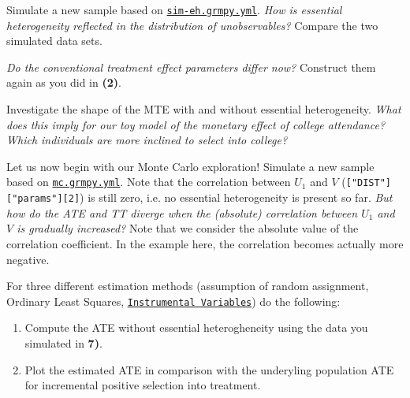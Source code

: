 \begin{boenumerate}\setcounter{enumi}{3}
  
  \item Simulate a new sample based on \href{https://github.com/HumanCapitalAnalysis/microeconometrics/blob/prset_grmpy/problem-sets/04-generalized-roy-model/sources/sim-eh.grmpy.yml}{\texttt{sim-eh.grmpy.yml}}. \emph{How is essential heterogeneity reflected in the distribution of unobservables?} Compare the two simulated data sets.
  
  \item \emph{Do the conventional treatment effect parameters differ now?} Construct them again as you did in \textbf{(2)}.
  
  \item Investigate the shape of the MTE with and without essential heterogeneity. \emph{What does this imply for our toy model of the monetary effect of college attendance? Which individuals are more inclined to select into college?}
  
  \item Let us now begin with our Monte Carlo exploration! Simulate a new sample based on \href{https://github.com/HumanCapitalAnalysis/microeconometrics/blob/prset_grmpy/problem-sets/04-generalized-roy-model/sources/mc.grmpy.yml}{\texttt{mc.grmpy.yml}}. Note that the correlation between $U_1$ and $V$ (\texttt{["DIST"]["params"][2]}) is still zero, i.e. no essential heterogeneity is present so far. \emph{But how do the ATE and TT diverge when the (absolute) correlation between $U_1$ and $V$ is gradually increased?} Note that we consider the absolute value of the correlation coefficient. In the example here, the correlation becomes actually more negative.
  
  \item For three different estimation methods (assumption of random assignment, Ordinary Least Squares, \href{https://bashtage.github.io/linearmodels/doc/iv/introduction.html}{\texttt{Instrumental Variables}}) do the following:
  \begin{enumerate}
  	\item Compute the ATE without essential heterogheneity using the data you simulated in \textbf{7)}.
  	\item Plot the estimated ATE in comparison with the underyling population ATE for incremental positive selection into treatment. 
  	
  \end{enumerate}


\end{boenumerate}
